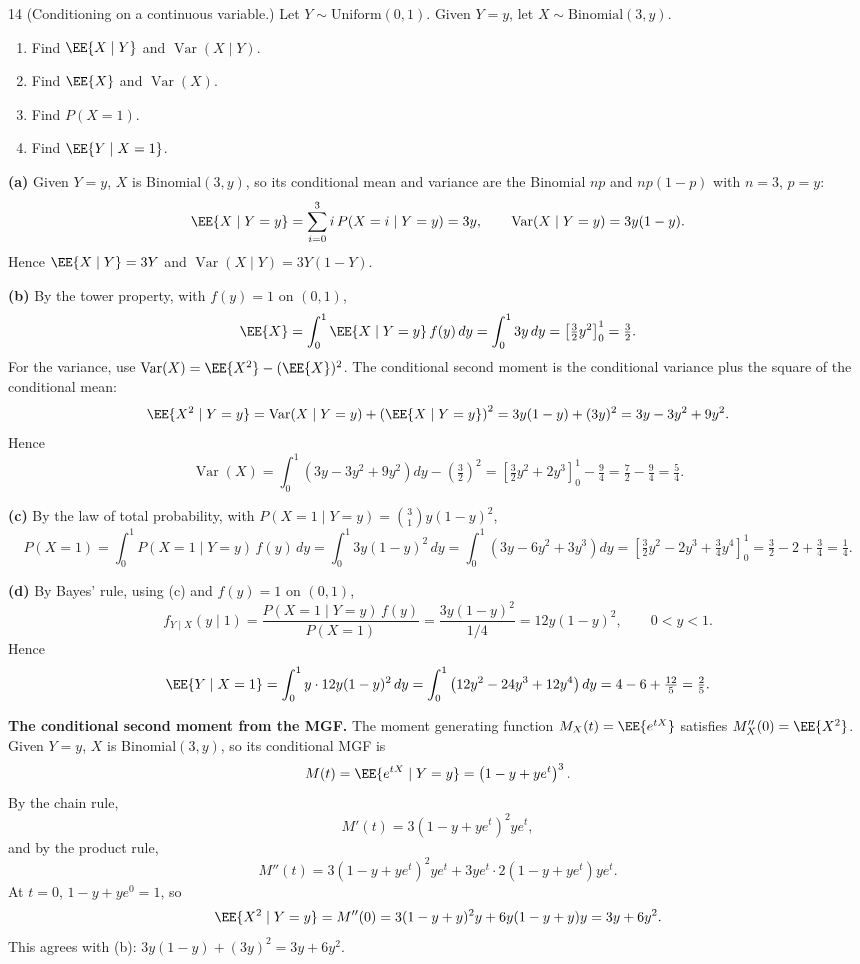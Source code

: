\documentclass[11pt]{article}
\begin{document}
\begin{problem}{14}
  (Conditioning on a continuous variable.) Let $Y \sim \text{Uniform}(0,1)$. Given $Y = y$,
  let $X \sim \text{Binomial}(3, y)$.
  \begin{enumerate}
    \item[(a)] Find $\EE{X \mid Y}$ and $\operatorname{Var}(X \mid Y)$.
    \item[(b)] Find $\EE{X}$ and $\operatorname{Var}(X)$.
    \item[(c)] Find $P(X = 1)$.
    \item[(d)] Find $\EE{Y \mid X = 1}$.
  \end{enumerate}
\end{problem}
\textbf{(a)} Given $Y = y$, $X$ is Binomial$(3, y)$, so its conditional mean and variance
are the Binomial $np$ and $np(1-p)$ with $n = 3$, $p = y$:
\[
  \EE{X \mid Y = y} = \sum_{i=0}^{3} i\,P(X = i \mid Y = y) = 3y,
  \qquad
  \operatorname{Var}(X \mid Y = y) = 3y(1-y).
\]
Hence $\EE{X \mid Y} = 3Y$ and $\operatorname{Var}(X \mid Y) = 3Y(1-Y)$.

\textbf{(b)} By the tower property, with $f(y) = 1$ on $(0,1)$,
\[
  \EE{X} = \int_0^1 \EE{X \mid Y = y}\, f(y)\, dy = \int_0^1 3y\, dy
  = \left[\tfrac32 y^2\right]_0^1 = \tfrac32.
\]
For the variance, use $\operatorname{Var}(X) = \EE{X^2} - (\EE{X})^2$. The conditional second
moment is the conditional variance plus the square of the conditional mean:
\[
  \EE{X^2 \mid Y = y} = \operatorname{Var}(X \mid Y = y) + \left(\EE{X \mid Y = y}\right)^2
  = 3y(1-y) + (3y)^2 = 3y - 3y^2 + 9y^2.
\]
Hence
\[
  \operatorname{Var}(X) = \int_0^1 \left(3y - 3y^2 + 9y^2\right) dy - \left(\tfrac32\right)^2
  = \left[\tfrac32 y^2 + 2y^3\right]_0^1 - \tfrac94
  = \tfrac72 - \tfrac94 = \tfrac54.
\]

\textbf{(c)} By the law of total probability, with $P(X = 1 \mid Y = y) = \binom31 y(1-y)^2$,
\[
  P(X = 1) = \int_0^1 P(X = 1 \mid Y = y)\, f(y)\, dy
  = \int_0^1 3y(1-y)^2\, dy
  = \int_0^1 \left(3y - 6y^2 + 3y^3\right) dy
  = \left[\tfrac32 y^2 - 2y^3 + \tfrac34 y^4\right]_0^1
  = \tfrac32 - 2 + \tfrac34 = \tfrac14.
\]

\textbf{(d)} By Bayes' rule, using (c) and $f(y) = 1$ on $(0,1)$,
\[
  f_{Y \mid X}(y \mid 1) = \frac{P(X = 1 \mid Y = y)\, f(y)}{P(X = 1)}
  = \frac{3y(1-y)^2}{1/4} = 12y(1-y)^2, \qquad 0 < y < 1.
\]
Hence
\[
  \EE{Y \mid X = 1} = \int_0^1 y \cdot 12y(1-y)^2\, dy
  = \int_0^1 \left(12y^2 - 24y^3 + 12y^4\right) dy
  = 4 - 6 + \tfrac{12}{5} = \tfrac25.
\]

\textbf{The conditional second moment from the MGF.} The moment generating function
$M_X(t) = \EE{e^{tX}}$ satisfies $M_X''(0) = \EE{X^2}$. Given $Y = y$, $X$ is
Binomial$(3, y)$, so its conditional MGF is
\[
  M(t) = \EE{e^{tX} \mid Y = y} = \left(1 - y + y e^t\right)^3.
\]
By the chain rule,
\[
  M'(t) = 3\left(1 - y + y e^t\right)^2 y e^t,
\]
and by the product rule,
\[
  M''(t) = 3\left(1 - y + y e^t\right)^2 y e^t
  + 3y e^t \cdot 2\left(1 - y + y e^t\right) y e^t.
\]
At $t = 0$, $1 - y + y e^0 = 1$, so
\[
  \EE{X^2 \mid Y = y} = M''(0) = 3(1 - y + y)^2 y + 6y(1 - y + y)y = 3y + 6y^2.
\]
This agrees with (b): $3y(1-y) + (3y)^2 = 3y + 6y^2$.
\end{document}
